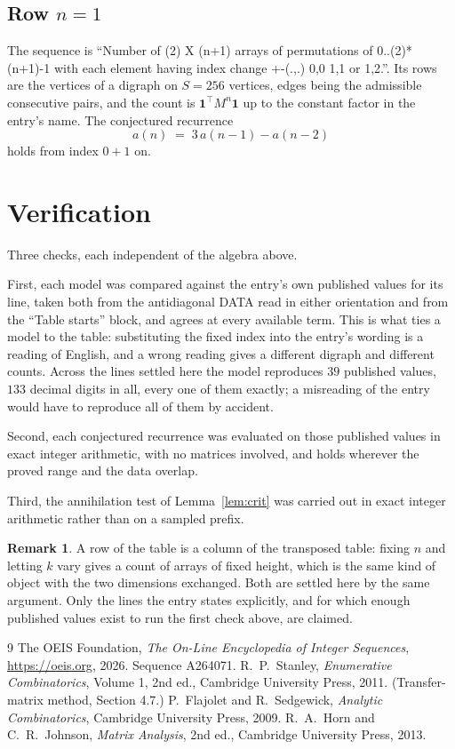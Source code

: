 \documentclass[11pt,a4paper]{article}
\theoremstyle{plain}
\theoremstyle{definition}
\newtheorem{remark}[theorem]{Remark}
\begin{document}
\subsection*{Row $n$$=1$}
The sequence is ``Number of (2) X (n+1) arrays of permutations of 0..(2)*(n+1)-1 with each element having index change +-(.,.) 0,0 1,1 or 1,2.''. Its rows are the vertices of a digraph on
$S=256$ vertices, edges being the admissible consecutive pairs, and the count is
$\mathbf{1}^{\!\top}M^{n}\mathbf{1}$ up to the constant factor in the entry's name.
The conjectured recurrence
\[
a(n)\;=\;3\,a(n-1) - a(n-2)
\]
holds from index $0+1$ on.

\section{Verification}

Three checks, each independent of the algebra above.

First, each model was compared against the entry's own published values for its line, taken
both from the antidiagonal DATA read in either orientation and from the ``Table starts''
block, and agrees at every available term. This is what ties a model to the table:
substituting the fixed index into the entry's wording is a reading of English, and a wrong
reading gives a different digraph and different counts. Across the lines settled here the
model reproduces $39$ published values, $133$ decimal digits in all, every one of
them exactly; a misreading of the entry would have to reproduce all of them by accident.

Second, each conjectured recurrence was evaluated on those published values in exact
integer arithmetic, with no matrices involved, and holds wherever the proved range and the
data overlap.

Third, the annihilation test of Lemma~\ref{lem:crit} was carried out in exact integer
arithmetic rather than on a sampled prefix.

\begin{remark}
A row of the table is a column of the transposed table: fixing $n$ and letting $k$ vary gives a
count of arrays of fixed height, which is the same kind of object with the two dimensions
exchanged. Both are settled here by the same argument. Only the lines the entry states
explicitly, and for which enough published values exist to run the first check above, are
claimed.
\end{remark}

\begin{thebibliography}{9}
 The OEIS Foundation, \emph{The On-Line Encyclopedia of Integer
Sequences}, \url{https://oeis.org}, 2026. Sequence A264071.
 R.~P.~Stanley, \emph{Enumerative Combinatorics}, Volume 1, 2nd ed.,
Cambridge University Press, 2011. (Transfer-matrix method, Section 4.7.)
 P.~Flajolet and R.~Sedgewick, \emph{Analytic Combinatorics}, Cambridge
University Press, 2009.
 R.~A.~Horn and C.~R.~Johnson, \emph{Matrix Analysis}, 2nd ed., Cambridge
University Press, 2013.
\end{thebibliography}
\end{document}
